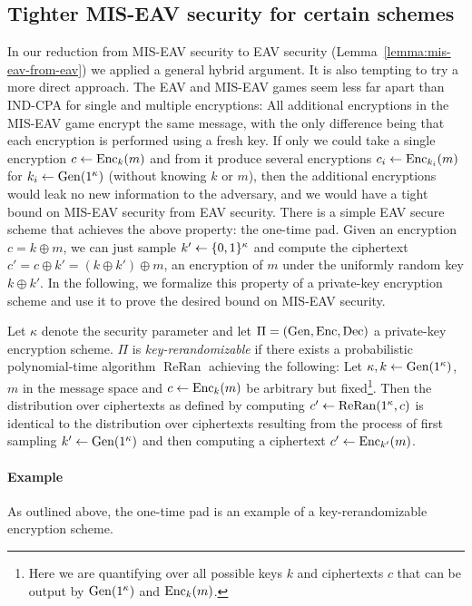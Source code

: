 \subsection{Tighter MIS-EAV security for certain schemes} \label{sec:tighter-mis-eav-security}

In our reduction from MIS-EAV security to EAV security (Lemma~\ref{lemma:mis-eav-from-eav}) we applied a general hybrid argument. It is also tempting to try a more direct approach. The EAV and MIS-EAV games seem less far apart than IND-CPA for single and multiple encryptions: All additional encryptions in the MIS-EAV game encrypt the same message, with the only difference being that each encryption is performed using a fresh key. If only we could take a single encryption $c \leftarrow \mathrm{Enc}_k(m)$ and from it produce several encryptions $c_i \leftarrow \mathrm{Enc}_{k_i}(m)$ for $k_i \leftarrow \mathrm{Gen}(1^\kappa)$ (without knowing $k$ or $m$), then the additional encryptions would leak no new information to the adversary, and we would have a tight bound on MIS-EAV security from EAV security. There is a simple EAV secure scheme that achieves the above property: the one-time pad. Given an encryption $c = k \oplus m$, we can just sample $k' \leftarrow \{0, 1\}^\kappa$ and compute the ciphertext $c' = c \oplus k' = (k \oplus k') \oplus m$, an encryption of $m$ under the uniformly random key $k \oplus k'$. In the following, we formalize this property of a private-key encryption scheme and use it to prove the desired bound on MIS-EAV security.

\begin{definition} \label{def:key-rerandomizability}
	Let $\kappa$ denote the security parameter and let $\Pi = (\mathrm{Gen}, \mathrm{Enc}, \mathrm{Dec})$ a private-key encryption scheme. $\Pi$ is \emph{key-rerandomizable} if there exists a probabilistic polynomial-time algorithm $\operatorname{ReRan}$ achieving the following: Let $\kappa, k \leftarrow \mathrm{Gen}(1^\kappa)$, $m$ in the message space and $c \leftarrow \mathrm{Enc}_k(m)$ be arbitrary but fixed\footnote{Here we are quantifying over all possible keys $k$ and ciphertexts $c$ that can be output by $\mathrm{Gen}(1^\kappa)$ and $\mathrm{Enc}_k(m)$.}. Then the distribution over ciphertexts as defined by computing $c' \leftarrow \operatorname{ReRan}(1^\kappa, c)$ is identical to the distribution over ciphertexts resulting from the process of first sampling $k' \leftarrow \mathrm{Gen}(1^\kappa)$ and then computing a ciphertext $c' \leftarrow \mathrm{Enc}_{k'}(m)$.
\end{definition}

\paragraph{Example} As outlined above, the one-time pad is an example of a key-rerandomizable encryption scheme.

